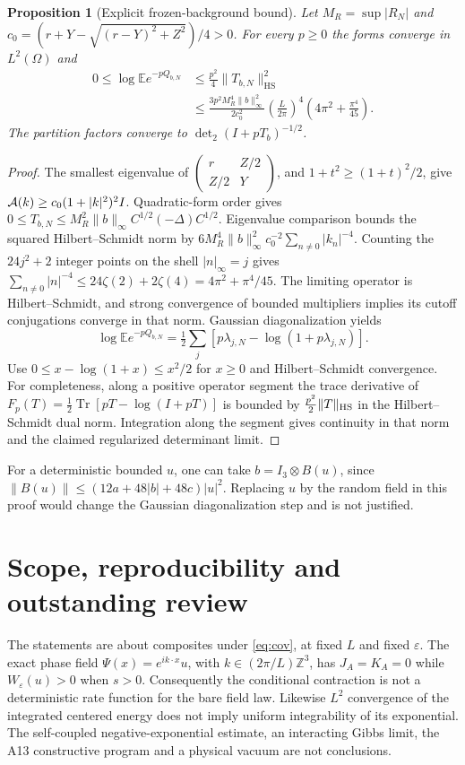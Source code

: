 \documentclass[11pt]{article}
\newtheorem{proposition}[theorem]{Proposition}
\newcommand{\E}{\mathbb E}
\newcommand{\tr}{\operatorname{Tr}}
\newcommand{\eps}{\varepsilon}
\begin{document}
\begin{proposition}[Explicit frozen-background bound]\label{prop:det}
Let $M_R=\sup|R_N|$ and
$c_0=(r+Y-\sqrt{(r-Y)^2+Z^2})/4>0$.
For every $p\ge0$ the forms converge in $L^2(\Omega)$ and
\begin{align}\label{eq:det}
 0\le\log\E e^{-pQ_{b,N}}
 &\le\frac{p^2}{4}\|T_{b,N}\|_{\mathrm{HS}}^2\nonumber\\
 &\le\frac{3p^2M_R^4\|b\|_\infty^2}{2c_0^2}
       \left(\frac{L}{2\pi}\right)^4
       \left(4\pi^2+\frac{\pi^4}{45}\right).
\end{align}
The partition factors converge to $\det_2(I+pT_b)^{-1/2}$.
\end{proposition}
\begin{proof}
The smallest eigenvalue of
$\left(\begin{smallmatrix}r&Z/2\\Z/2&Y\end{smallmatrix}\right)$,
and $1+t^2\ge(1+t)^2/2$, give
${\cal A}(k)\ge c_0(1+|k|^2)^2I$.
Quadratic-form order gives
$0\le T_{b,N}\le M_R^2\|b\|_\infty C^{1/2}(-\Delta)C^{1/2}$.
Eigenvalue comparison bounds the squared Hilbert--Schmidt norm by
$6M_R^4\|b\|_\infty^2c_0^{-2}\sum_{n\ne0}|k_n|^{-4}$.
Counting the $24j^2+2$ integer points on the shell $|n|_\infty=j$
gives $\sum_{n\ne0}|n|^{-4}\le24\zeta(2)+2\zeta(4)
=4\pi^2+\pi^4/45$.
The limiting operator is Hilbert--Schmidt, and strong convergence of bounded
multipliers implies its cutoff conjugations converge in that norm.
Gaussian diagonalization yields
\[
 \log\E e^{-pQ_{b,N}}=\tfrac12\sum_j
       [p\lambda_{j,N}-\log(1+p\lambda_{j,N})].
\]
Use $0\le x-\log(1+x)\le x^2/2$ for $x\ge0$ and Hilbert--Schmidt
convergence. For completeness, along a positive operator segment the
trace derivative of $F_p(T)=\tfrac12\tr[pT-\log(I+pT)]$ is bounded by
$\tfrac{p^2}{2}\|T\|_{\rm HS}$ in the Hilbert--Schmidt dual norm.
Integration along the segment gives continuity in that norm and the
claimed regularized determinant limit.
\end{proof}

For a deterministic bounded $u$, one can take $b=I_3\otimes B(u)$, since
$\|B(u)\|\le(12a+48|b|+48c)|u|^2$.
Replacing $u$ by the random field in this proof would change the Gaussian
diagonalization step and is not justified.

\section{Scope, reproducibility and outstanding review}
The statements are about composites under \eqref{eq:cov}, at fixed $L$ and
fixed $\eps$. The exact phase field $\Psi(x)=e^{ik\cdot x}u$, with
$k\in(2\pi/L)\mathbb Z^3$, has
$J_A=K_A=0$ while $W_\eps(u)>0$ when $s>0$.
Consequently the conditional contraction is not a deterministic rate
function for the bare field law. Likewise $L^2$ convergence of the integrated
centered energy does not imply uniform integrability of its exponential.
The self-coupled negative-exponential estimate, an interacting Gibbs limit,
the A13 constructive program and a physical vacuum are not conclusions.
\end{document}
